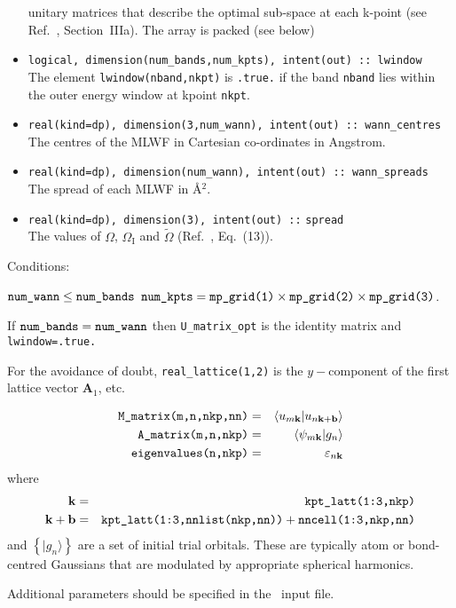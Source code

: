 \begin{itemize}
      unitary matrices that describe the optimal sub-space at each
      k-point (see Ref.~\cite{SMV}, Section~{\sc IIIa}). The array is
      packed (see below) 
\item \verb#logical, dimension(num_bands,num_kpts), intent(out) :: lwindow#\\ 
       The element \verb#lwindow(nband,nkpt)# is {\tt .true.} if the band
{\tt nband} lies within the outer energy window at kpoint {\tt nkpt}.
\item \verb#real(kind=dp), dimension(3,num_wann), intent(out) :: wann_centres#\\   
      The centres of the MLWF in Cartesian co-ordinates in Angstrom. 
\item \verb#real(kind=dp), dimension(num_wann), intent(out) :: wann_spreads#\\ 
      The spread of each MLWF in \AA$^{2}$.
\item \verb#real(kind=dp), dimension(3), intent(out) ::#
      \verb#spread#\\ 
      The values of $\Omega$, $\Omega_{\mathrm{I}}$ and
      $\tilde{\Omega}$ (Ref.~\cite{MV}, Eq.~(13)). 
\end{itemize}

Conditions:
\begin{itemize}
\cond $\verb#num_wann# \le \verb#num_bands#$
\cond $\verb#num_kpts# = \verb#mp_grid(1)# \times \verb#mp_grid(2)#
\times \verb#mp_grid(3)#$.
\end{itemize}

If $\verb#num_bands# = \verb#num_wann#$ then \verb#U_matrix_opt# is the identity matrix and
\verb#lwindow=.true.#

For the avoidance of doubt, \verb#real_lattice(1,2)# is the
$y-$component of the first lattice 
vector $\mathbf{A}_{1}$, etc.

\begin{eqnarray*}
\verb#M_matrix(m,n,nkp,nn)# & = & \left\langle u_{m\mathbf{k}} |
u_{n\mathbf{k+b}}\right\rangle\\
\verb#A_matrix(m,n,nkp)# & = &
\left\langle \psi_{m\mathbf{k}}|g_{n}\right\rangle\\
\verb#eigenvalues(n,nkp)# &=& \varepsilon_{n\mathbf{k}}
\end{eqnarray*}
where
\begin{eqnarray*}
\mathbf{k} &=&\verb#kpt_latt(1:3,nkp)#\\
\mathbf{k+b}&=& \verb#kpt_latt(1:3,nnlist(nkp,nn))# +
\verb#nncell(1:3,nkp,nn)# 
\end{eqnarray*}
and
$\left\{|g_{n}\rangle\right\}$ are a set of initial trial
orbitals. These are
typically atom or bond-centred Gaussians that are modulated by
appropriate spherical harmonics. 

Additional parameters should be specified in the \wannier\ input
file.

